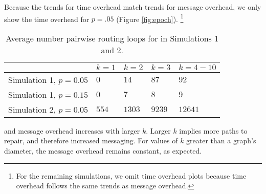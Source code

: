 Because the trends for time overhead match trends for message overhead, we only show the time overhead for $p=.05$ (Figure \ref{fig:epoch}). 
{\footnote {\small For the remaining simulations, we omit time overhead plots because time overhead follows the same trends as message overhead.}}

\begin{table}
\begin{center}
\begin{tabular}{l|l|l|l|l}
 & $k=1$&  $k=2$ & $k=3$ & $k=4-10$ \\
\hline
 Simulation 1, $p=0.05$  & $0$ & $14$ & $87$ &  $92$ \\
 Simulation 1, $p=0.15$  & $0$ & $7$&  $8$ & $9$ \\
 Simulation 2, $p=0.05$  & $554$ & $1303$ & $9239$ &  $12641$ \\
\end{tabular}
\end{center}
\caption{Average number pairwise routing loops for \second in Simulations 1 and 2.}
\label{tab:loop1}
\end{table}


\purge and \second message overhead increases with larger $k$. Larger $k$ implies more paths to repair, and therefore increased messaging.
For values of $k$ greater than a graph's diameter, the message overhead remains constant, as expected. 



